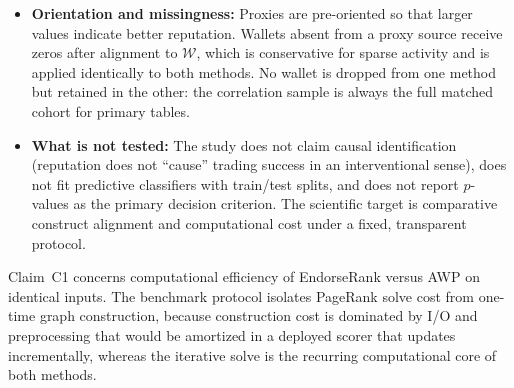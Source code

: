 \begin{itemize}
\item \textbf{Orientation and missingness:} Proxies are pre-oriented so that larger values indicate better reputation. Wallets absent from a proxy source receive zeros after alignment to $\mathcal{W}$, which is conservative for sparse activity and is applied identically to both methods. No wallet is dropped from one method but retained in the other: the correlation sample is always the full matched cohort for primary tables.

\item \textbf{What is not tested:} The study does not claim causal identification (reputation does not ``cause'' trading success in an interventional sense), does not fit predictive classifiers with train/test splits, and does not report $p$-values as the primary decision criterion. The scientific target is comparative construct alignment and computational cost under a fixed, transparent protocol.

\end{itemize}


Claim~C1 concerns computational efficiency of EndorseRank versus AWP on identical inputs. The benchmark protocol isolates PageRank solve cost from one-time graph construction, because construction cost is dominated by I/O and preprocessing that would be amortized in a deployed scorer that updates incrementally, whereas the iterative solve is the recurring computational core of both methods.

